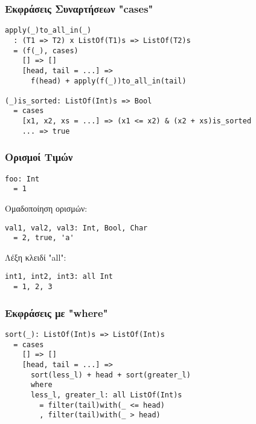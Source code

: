 \documentclass{beamer}
\def\e{\foreignlanguage{english}}
\begin{document}
\begin{frame}[fragile]

\frametitle{Εκφράσεις Συναρτήσεων \e{"cases"}}

\begin{otherlanguage}{english}
\begin{verbatim}
apply(_)to_all_in(_)
  : (T1 => T2) x ListOf(T1)s => ListOf(T2)s
  = (f(_), cases)
    [] => []
    [head, tail = ...] =>
      f(head) + apply(f(_))to_all_in(tail)

(_)is_sorted: ListOf(Int)s => Bool
  = cases
    [x1, x2, xs = ...] => (x1 <= x2) & (x2 + xs)is_sorted
    ... => true
\end{verbatim}
\end{otherlanguage}

\end{frame}

\begin{frame}[fragile]

\frametitle{Ορισμοί Τιμών}

\begin{otherlanguage}{english}
\begin{verbatim}
foo: Int
  = 1
\end{verbatim}
\end{otherlanguage}
Ομαδοποίηση ορισμών:
\begin{otherlanguage}{english}
\begin{verbatim}
val1, val2, val3: Int, Bool, Char
  = 2, true, 'a'
\end{verbatim}
\end{otherlanguage}
Λέξη κλειδί \e{"all"}:
\begin{otherlanguage}{english}
\begin{verbatim}
int1, int2, int3: all Int
  = 1, 2, 3
\end{verbatim}
\end{otherlanguage}

\end{frame}

\begin{frame}[fragile]

\frametitle{Εκφράσεις με \e{"where"}}

\begin{otherlanguage}{english}
\begin{verbatim}
sort(_): ListOf(Int)s => ListOf(Int)s
  = cases
    [] => []
    [head, tail = ...] =>
      sort(less_l) + head + sort(greater_l)
      where
      less_l, greater_l: all ListOf(Int)s
        = filter(tail)with(_ <= head)
        , filter(tail)with(_ > head)
\end{verbatim}
\end{otherlanguage}

\end{frame}
\end{document}
